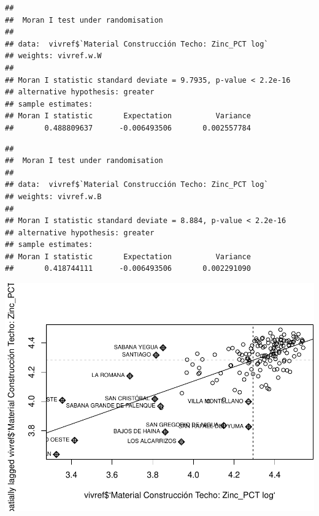 \documentclass[11pt,]{article}
\newenvironment{Shaded}{\begin{snugshade}}{\end{snugshade}}
\newcommand{\KeywordTok}[1]{\textcolor[rgb]{0.13,0.29,0.53}{\textbf{#1}}}
\newcommand{\DataTypeTok}[1]{\textcolor[rgb]{0.13,0.29,0.53}{#1}}
\newcommand{\StringTok}[1]{\textcolor[rgb]{0.31,0.60,0.02}{#1}}
\newcommand{\OperatorTok}[1]{\textcolor[rgb]{0.81,0.36,0.00}{\textbf{#1}}}
\newcommand{\NormalTok}[1]{#1}
\begin{document}
\begin{verbatim}
## 
##  Moran I test under randomisation
## 
## data:  vivref$`Material Construcción Techo: Zinc_PCT log`  
## weights: vivref.w.W    
## 
## Moran I statistic standard deviate = 9.7935, p-value < 2.2e-16
## alternative hypothesis: greater
## sample estimates:
## Moran I statistic       Expectation          Variance 
##       0.488809637      -0.006493506       0.002557784
\end{verbatim}

\begin{Shaded}
\end{Shaded}

\begin{verbatim}
## 
##  Moran I test under randomisation
## 
## data:  vivref$`Material Construcción Techo: Zinc_PCT log`  
## weights: vivref.w.B    
## 
## Moran I statistic standard deviate = 8.884, p-value < 2.2e-16
## alternative hypothesis: greater
## sample estimates:
## Moran I statistic       Expectation          Variance 
##       0.418744111      -0.006493506       0.002291090
\end{verbatim}

\begin{Shaded}
\end{Shaded}

\includegraphics{proyecto_files/figure-latex/unnamed-chunk-2-14.pdf}
\end{document}

